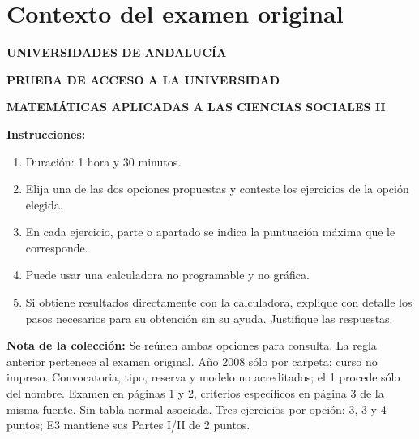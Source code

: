 \section*{Contexto del examen original}
\textbf{UNIVERSIDADES DE ANDALUCÍA}\par
\textbf{PRUEBA DE ACCESO A LA UNIVERSIDAD}\par
\textbf{MATEMÁTICAS APLICADAS A LAS CIENCIAS SOCIALES II}

\textbf{Instrucciones:}
\begin{enumerate}[label=\textbf{\alph*)}]
  \item Duración: 1 hora y 30 minutos.
  \item Elija una de las dos opciones propuestas y conteste los ejercicios de la opción elegida.
  \item En cada ejercicio, parte o apartado se indica la puntuación máxima que le corresponde.
  \item Puede usar una calculadora no programable y no gráfica.
  \item Si obtiene resultados directamente con la calculadora, explique con detalle los pasos necesarios para su obtención sin su ayuda. Justifique las respuestas.
\end{enumerate}
\noindent\textbf{Nota de la colección:} Se reúnen ambas opciones para consulta. La regla anterior pertenece al examen original. Año 2008 sólo por carpeta; curso no impreso. Convocatoria, tipo, reserva y modelo no acreditados; el 1 procede sólo del nombre. Examen en páginas 1 y 2, criterios específicos en página 3 de la misma fuente. Sin tabla normal asociada. Tres ejercicios por opción: 3, 3 y 4 puntos; E3 mantiene sus Partes I/II de 2 puntos.
\par\medskip
